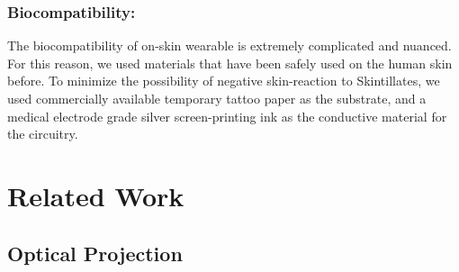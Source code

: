 \documentclass{sigchi}
\begin{document}
\subsubsection{Biocompatibility:}
The biocompatibility of on-skin wearable is extremely complicated and nuanced. For this reason, we used materials that have been safely used on the human skin before. To minimize the possibility of negative skin-reaction to Skintillates, we used commercially available temporary tattoo paper as the substrate, and a medical electrode grade silver screen-printing ink as the conductive material for the circuitry. 

\section{Related Work}
\subsection{Optical Projection}
\end{document}
